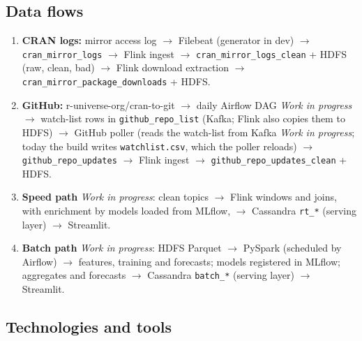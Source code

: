 \documentclass[11pt,a4paper]{article}
\newcommand{\planned}{\textit{Work in progress}}
\begin{document}
\subsection{Data flows}

\begin{enumerate}
  \item \textbf{CRAN logs:} mirror access log $\to$ Filebeat (generator in dev) $\to$ \texttt{cran\_\allowbreak{}mirror\_\allowbreak{}logs} $\to$ Flink ingest $\to$ \texttt{cran\_\allowbreak{}mirror\_\allowbreak{}logs\_\allowbreak{}clean} + HDFS
        (raw, clean, bad) $\to$ Flink download extraction $\to$ \texttt{cran\_\allowbreak{}mirror\_\allowbreak{}package\_\allowbreak{}downloads} + HDFS.
  \item \textbf{GitHub:} r-universe-org/cran-to-git $\to$ daily Airflow DAG \planned\ $\to$ watch-list rows in \texttt{github\_\allowbreak{}repo\_\allowbreak{}list} (Kafka; Flink also copies them to HDFS)
        $\to$ GitHub poller (reads the watch-list from Kafka \planned; today the build writes \texttt{watchlist.csv}, which the poller reloads) $\to$ \texttt{github\_\allowbreak{}repo\_\allowbreak{}updates} $\to$
        Flink ingest $\to$ \texttt{github\_\allowbreak{}repo\_\allowbreak{}updates\_\allowbreak{}clean} + HDFS.
  \item \textbf{Speed path} \planned: clean topics $\to$ Flink windows and joins, with enrichment by models loaded from MLflow, $\to$ Cassandra \texttt{rt\_\allowbreak{}*} (serving layer) $\to$ Streamlit.
  \item \textbf{Batch path} \planned: HDFS Parquet $\to$ PySpark (scheduled by Airflow) $\to$ features, training and forecasts; models registered in MLflow; aggregates and forecasts $\to$ Cassandra \texttt{batch\_\allowbreak{}*} (serving layer) $\to$ Streamlit.
\end{enumerate}

\subsection{Technologies and tools}
\end{document}
